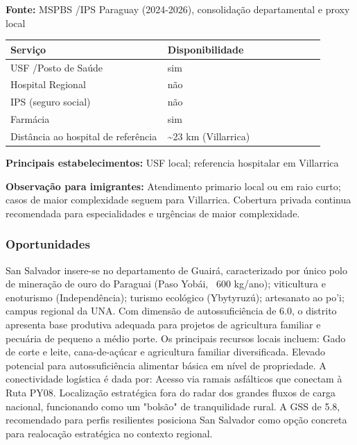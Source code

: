 \textbf{Fonte:} MSPBS /\allowbreak  IPS Paraguay (2024-2026), consolidação
departamental e proxy local

{\def\LTcaptype{none} %
\begin{longtable}{@{}>{\raggedright\arraybackslash}p{0.45\linewidth} >{\raggedright\arraybackslash}p{0.45\linewidth}@{}}
\toprule\noalign{}
Serviço & Disponibilidade \\
\midrule\noalign{}
\endhead
\bottomrule\noalign{}
\endlastfoot
USF /\allowbreak  Posto de Saúde & sim \\
Hospital Regional & não \\
IPS (seguro social) & não \\
Farmácia & sim \\
Distância ao hospital de referência & \textasciitilde23 km
(Villarrica) \\
\end{longtable}
}

\textbf{Principais estabelecimentos:} USF local; referencia hospitalar
em Villarrica

\textbf{Observação para imigrantes:} Atendimento primario local ou em
raio curto; casos de maior complexidade seguem para Villarrica.
Cobertura privada continua recomendada para especialidades e urgências
de maior complexidade.
\newpage

\subsubsection*{Oportunidades}\label{oport-san-salvador-0414}
San Salvador insere-se no departamento de Guairá, caracterizado por único polo de mineração de ouro do Paraguai (Paso Yobái, ~600 kg/ano); viticultura e enoturismo (Independência); turismo ecológico (Ybytyruzú); artesanato ao po'i; campus regional da UNA. Com dimensão de autossuficiência de 6.0, o distrito apresenta base produtiva adequada para projetos de agricultura familiar e pecuária de pequeno a médio porte. Os principais recursos locais incluem: Gado de corte e leite, cana-de-açúcar e agricultura familiar diversificada. Elevado potencial para autossuficiência alimentar básica em nível de propriedade. A conectividade logística é dada por: Acesso via ramais asfálticos que conectam à Ruta PY08. Localização estratégica fora do radar dos grandes fluxos de carga nacional, funcionando como um "bolsão" de tranquilidade rural. A GSS de 5.8, recomendado para perfis resilientes posiciona San Salvador como opção concreta para realocação estratégica no contexto regional.

